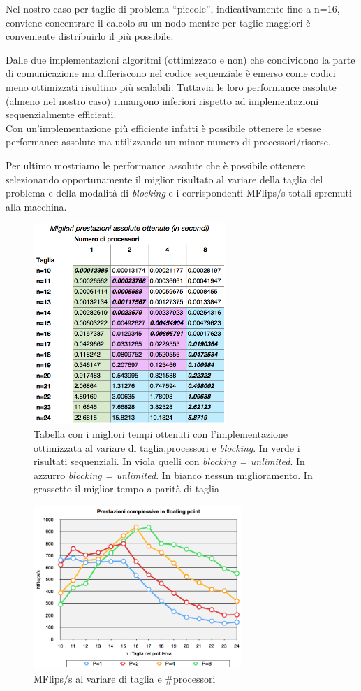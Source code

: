 \documentclass[12pt,a4paper,oneside,openright]{article}
\begin{document}
Nel nostro caso per taglie di problema ``piccole'', indicativamente fino a n=16, conviene concentrare il calcolo su un nodo mentre per taglie maggiori è conveniente distribuirlo il più possibile.

Dalle  due implementazioni algoritmi (ottimizzato e non) che condividono la parte di comunicazione ma differiscono nel codice sequenziale è emerso come codici meno ottimizzati risultino più scalabili. Tuttavia le loro performance assolute (almeno nel nostro caso) rimangono inferiori rispetto ad implementazioni sequenzialmente efficienti.\\ Con un'implementazione più efficiente infatti è possibile ottenere le stesse performance assolute ma utilizzando un minor numero di processori/risorse.

Per ultimo mostriamo le performance assolute che è possibile ottenere selezionando opportunamente il miglior risultato al variare della taglia del problema e della modalità di \emph{blocking} e i corrispondenti MFlips/s totali spremuti alla macchina.
\begin{figure}[htp] 
  \centering
  \linespread{1}
      \includegraphics[width=0.65\textwidth]{immagini/best_performance}
  \caption{\small Tabella con i migliori tempi ottenuti con l'implementazione ottimizzata al variare di taglia,processori e \emph{blocking}. In verde i risultati sequenziali. In viola quelli con \emph{blocking = unlimited}. In azzurro \emph{blocking = unlimited}. In bianco nessun miglioramento. In grassetto il miglior tempo a parità di taglia}
\end{figure}

\begin{figure}[htp] 
  \centering
      \includegraphics[width=0.70\textwidth]{immagini/mflips}
  \caption{\small MFlips/s al variare di taglia e \#processori}
\end{figure}
\end{document}
